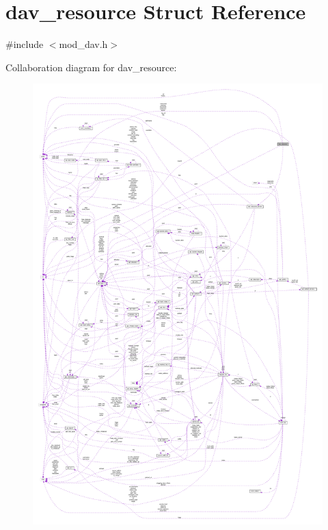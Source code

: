 \hypertarget{structdav__resource}{}\section{dav\+\_\+resource Struct Reference}
\label{structdav__resource}


{\ttfamily \#include $<$mod\+\_\+dav.\+h$>$}



Collaboration diagram for dav\+\_\+resource\+:
\nopagebreak
\begin{figure}[H]
\begin{center}
\leavevmode
\includegraphics[width=350pt]{structdav__resource__coll__graph}
\end{center}
\end{figure}
